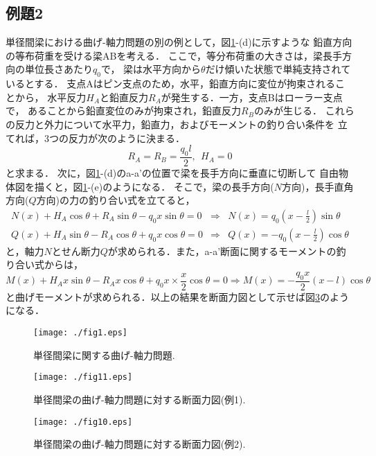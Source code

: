 ﻿\documentclass[10pt,a4j]{jbook}
\begin{document}
\subsection{例題2}
単径間梁における曲げ-軸力問題の別の例として，図\ref{fig:fig12_1}-(d)に示すような
鉛直方向の等布荷重を受ける梁ABを考える．
ここで，等分布荷重の大きさは，梁長手方向の単位長さあたり$q_0$で，
梁は水平方向から$\theta$だけ傾いた状態で単純支持されているとする．
支点Aはピン支点のため，水平，鉛直方向に変位が拘束されることから，
水平反力$H_A$と鉛直反力$R_A$が発生する．一方，支点Bはローラー支点で，
あることから鉛直変位のみが拘束され，鉛直反力$R_B$のみが生じる．
これらの反力と外力について水平力，鉛直力，およびモーメントの釣り合い条件を
立てれば，3つの反力が次のように決まる．
\begin{equation}
	R_A=R_B=\frac{q_0l}{2}, \ \ H_A=0
\end{equation}
と求まる．
次に，図\ref{fig:fig12_1}-(d)のa-a'の位置で梁を長手方向に垂直に切断して
自由物体図を描くと，図\ref{fig:fig12_1}-(e)のようになる．
そこで，梁の長手方向($N$方向)，長手直角方向($Q$方向)の力の釣り合い式を立てると，
\begin{eqnarray}
	N(x)+H_A\cos\theta +R_A\sin\theta - q_0x\sin \theta =0 
	& \Rightarrow  & 
	N(x)=q_0\left(x-\frac{l}{2}\right)\sin\theta
	\\
	Q(x)+H_A\sin\theta -R_A\cos\theta +q_0x\cos \theta =0 
	& \Rightarrow  &  
	Q(x)=-q_0\left(x-\frac{l}{2}\right) \cos\theta	
\end{eqnarray}
と，軸力$N$とせん断力$Q$が求められる．また，a-a'断面に関するモーメントの釣り合い式からは，
\begin{equation}
	M(x)+H_Ax\sin\theta -R_Ax\cos\theta +q_0x\times \frac{x}{2}\cos \theta =0 
	\Rightarrow    
	M(x)=-\frac{q_0x}{2}\left(x-l\right)\cos\theta
\end{equation}
と曲げモーメントが求められる．以上の結果を断面力図として示せば図\ref{fig:fig12_1_2}のようになる．
\begin{figure}[h]
	\begin{center}
	\texttt{[image: ./fig1.eps]} 
	\end{center}
	\caption{
		単径間梁に関する曲げ-軸力問題.
	} 
	\label{fig:fig12_1}
\end{figure}
\begin{figure}[h]
	\begin{center}
	\texttt{[image: ./fig11.eps]} 
	\end{center}
	\caption{
		単径間梁の曲げ-軸力問題に対する断面力図(例1).
	} 
	\label{fig:fig12_1_1}
\end{figure}
\begin{figure}[h]
	\begin{center}
	\texttt{[image: ./fig10.eps]} 
	\end{center}
	\caption{
		単径間梁の曲げ-軸力問題に対する断面力図(例2).
	} 
	\label{fig:fig12_1_2}
\end{figure}
\end{document}
